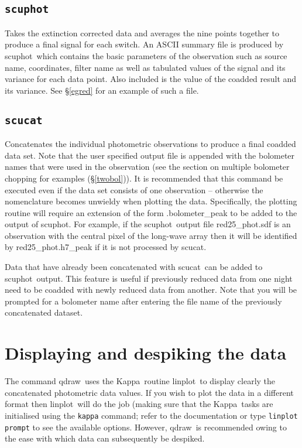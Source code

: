 \documentclass[twoside,11pt,fleqn]{article}
\newcommand{\Kappa}{\xref{{\sc Kappa}}{sun95}{}}
\newcommand{\task}[1]{{\sf #1}}
\newcommand{\scuphot}{\xref{\task{scuphot}}{sun216}{SCUPHOT}}
\newcommand{\scucat}{\xref{\task{scucat}}{sun216}{SCUCAT}}
\newcommand{\qdraw}{\xref{\task{qdraw}}{sun216}{QDRAW}}
\newcommand{\linplot}{\xref{\task{linplot}}{sun95}{LINPLOT}}
\newcommand{\xref}[3]{#1}
\begin{document}
\subsection{{\tt scuphot}}

Takes the extinction corrected data and averages the nine points
together to produce a final signal for each switch.  An ASCII summary
file is produced by \scuphot\ which contains the basic parameters
of the observation such as source name, coordinates, filter name as
well as tabulated values of the signal and its variance for each data
point. Also included is the value of the coadded result and its
variance. See \S \ref{egred} for an example of such a file.

\subsection{{\tt scucat}}

Concatenates the individual photometric observations to produce a final
coadded data set. Note that the user specified output file is appended with
the bolometer names that were used in the observation (see the section on
multiple bolometer chopping for examples (\S\ref{twobol})).  It is recommended
that this command be executed even if the data set consists of one observation
-- otherwise the nomenclature becomes unwieldy when plotting the
data. Specifically, the plotting routine will require an extension of the form
.bolometer\_peak to be added to the output of \scuphot. For example, if
the \scuphot\ output file red25\_phot.sdf is an observation with the
central pixel of the long-wave array then it will be identified by
red25\_phot.h7\_peak if it is not processed by \scucat.

Data that have already been concatenated with \scucat\ can be
added to \scuphot\ output. This feature is useful if previously
reduced data from one night need to be coadded with newly reduced data
from another. Note that you will be prompted for a bolometer name
after entering the file name of the previously concatenated dataset.

\section{Displaying and despiking the data}

The command \qdraw\ uses the \Kappa\ routine \linplot\ to display clearly the
concatenated photometric data values. If you wish to plot the data in a
different format then \linplot\ will do the job (making sure that the \Kappa\
tasks are initialised using the \texttt{kappa} command; refer to the
documentation or type {\tt linplot prompt} to see the available
options. However, \qdraw\ is recommended owing to the ease with which data can
subsequently be despiked.
\end{document}
